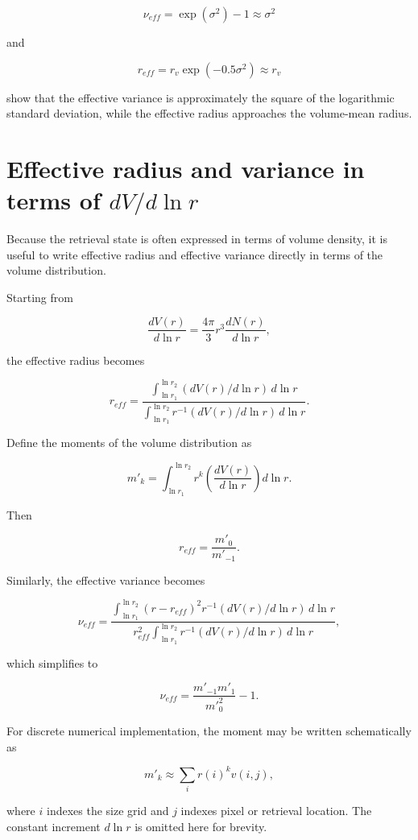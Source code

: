 \documentclass[
  letterpaper,
]{scrbook}
\begin{document}
\[
\nu_{eff}=\exp (\sigma^2)-1 \approx \sigma^2
\]

and

\[
r_{eff}= r_v \exp(-0.5 \sigma^2) \approx r_v
\]

show that the effective variance is approximately the square of the
logarithmic standard deviation, while the effective radius approaches
the volume-mean radius.

\section{\texorpdfstring{Effective radius and variance in terms of
\(dV/d\ln r\)}{Effective radius and variance in terms of dV/d\textbackslash ln r}}\label{effective-radius-and-variance-in-terms-of-dvdln-r}

Because the retrieval state is often expressed in terms of volume
density, it is useful to write effective radius and effective variance
directly in terms of the volume distribution.

Starting from

\[
\frac{d V(r)}{d \ln r}=\frac{4\pi}{3} r^3 \frac{d N(r)}{d \ln r},
\]

the effective radius becomes

\[
r_{eff}=\frac{\int_{\ln r_1}^{\ln r_2} (dV(r)/d\ln r) \, d\ln r}
{\int_{\ln r_1}^{\ln r_2} r^{-1} (dV(r)/d\ln r) \, d\ln r}.
\]

Define the moments of the volume distribution as

\[
m'_k = \int_{\ln r_1}^{\ln r_2} r^k \left(\frac{dV(r)}{d\ln r}\right) d\ln r.
\]

Then

\[
r_{eff}= \frac{m'_0}{m'_{-1}}.
\]

Similarly, the effective variance becomes

\[
\nu_{eff}=\frac{\int_{\ln r_1}^{\ln r_2}(r-r_{eff})^2 r^{-1} (dV(r)/d\ln r) \, d\ln r}
{r^2_{eff} \int_{\ln r_1}^{\ln r_2} r^{-1} (dV(r)/d\ln r) \, d\ln r},
\]

which simplifies to

\[
\nu_{eff}= \frac{m'_{-1} m'_1}{m'^2_0}-1.
\]

For discrete numerical implementation, the moment may be written
schematically as

\[
m'_k \approx \sum_i r(i)^k v(i,j),
\]

where \(i\) indexes the size grid and \(j\) indexes pixel or retrieval
location. The constant increment \(d\ln r\) is omitted here for brevity.
\end{document}
